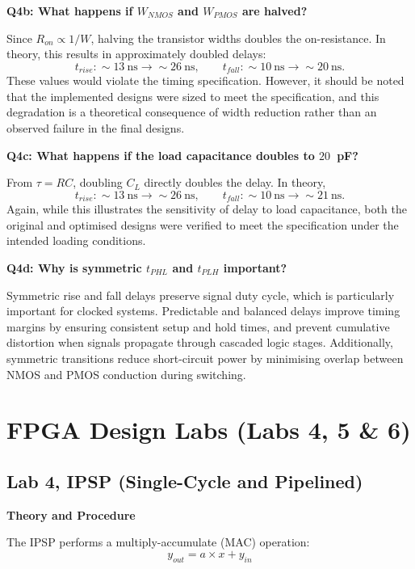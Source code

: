 \documentclass[a4paper,12pt]{article}
\begin{document}
\textbf{Q4b: What happens if $W_{NMOS}$ and $W_{PMOS}$ are halved?}

Since $R_{on} \propto 1/W$, halving the transistor widths doubles the on-resistance. In theory, this results in approximately doubled delays:
\[
t_{rise}: \sim 13~\text{ns} \rightarrow \sim 26~\text{ns},
\qquad
t_{fall}: \sim 10~\text{ns} \rightarrow \sim 20~\text{ns}.
\]
These values would violate the timing specification. However, it should be noted that the implemented designs were sized to meet the specification, and this degradation is a theoretical consequence of width reduction rather than an observed failure in the final designs.

\textbf{Q4c: What happens if the load capacitance doubles to $20$~pF?}

From $\tau = RC$, doubling $C_L$ directly doubles the delay. In theory,
\[
t_{rise}: \sim 13~\text{ns} \rightarrow \sim 26~\text{ns},
\qquad
t_{fall}: \sim 10~\text{ns} \rightarrow \sim 21~\text{ns}.
\]
Again, while this illustrates the sensitivity of delay to load capacitance, both the original and optimised designs were verified to meet the specification under the intended loading conditions.

\textbf{Q4d: Why is symmetric $t_{PHL}$ and $t_{PLH}$ important?}

Symmetric rise and fall delays preserve signal duty cycle, which is particularly important for clocked systems. Predictable and balanced delays improve timing margins by ensuring consistent setup and hold times, and prevent cumulative distortion when signals propagate through cascaded logic stages. Additionally, symmetric transitions reduce short-circuit power by minimising overlap between NMOS and PMOS conduction during switching.

\section{FPGA Design Labs \- (Labs 4, 5 \& 6)}

\subsection{Lab 4, IPSP (Single-Cycle and Pipelined)}

\textbf{Theory and Procedure}

The IPSP performs a multiply-accumulate (MAC) operation:
\begin{equation}
y_{out} = a \times x + y_{in}
\end{equation}
\end{document}
